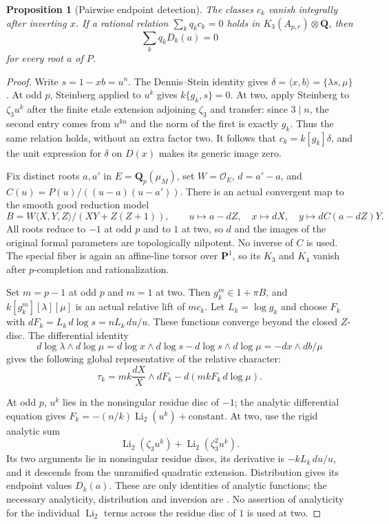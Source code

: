 \documentclass[11pt,a4paper]{article}
\newtheorem{proposition}[theorem]{Proposition}
\theoremstyle{remark}
\begin{document}
\begin{proposition}[Pairwise endpoint detection]
\label{prop:directtcendpoints}
The classes $c_k$ vanish integrally after inverting $x$.
If a rational relation $\sum_k q_kc_k=0$ holds in
$K_3(A_{p,r})\otimes\mathbf Q$, then
\[
       \sum_k q_kD_k(a)=0
\]
for every root $a$ of $P$.
\end{proposition}
\begin{proof}
Write $s=1-xb=u^n$. The Dennis--Stein identity gives
$\delta=\langle x,b\rangle=\{\lambda s,\mu\}$.
At odd $p$, Steinberg applied to $u^k$ gives $k\{g_k,s\}=0$.
At two, apply Steinberg to $\zeta_3u^k$ after the finite etale
extension adjoining $\zeta_3$ and transfer: since $3\mid n$, the
second entry comes from $u^{kn}$ and the norm of the first is exactly
$g_k$. Thus the same relation holds, without an extra factor two.
It follows that $c_k=k[g_k]\delta$, and the unit expression for
$\delta$ on $D(x)$ makes its generic image zero.

Fix distinct roots $a,a'$ in $E=\mathbf Q_p(\mu_M)$, set
$W=\mathcal O_E$, $d=a'-a$, and
$C(u)=P(u)/((u-a)(u-a'))$. There is an actual convergent map to the
smooth good reduction model
\[
 B=W\langle X,Y,Z\rangle/(XY+Z(Z+1)),\qquad
 u\mapsto a-dZ,\quad x\mapsto dX,\quad
 y\mapsto dC(a-dZ)Y.
\]
All roots reduce to $-1$ at odd $p$ and to $1$ at two, so $d$ and
the images of the original formal parameters are topologically
nilpotent. No inverse of $C$ is used. The special fiber is again an
affine-line torsor over $\mathbf P^1$, so its $K_3$ and $K_4$
vanish after $p$-completion and rationalization.

Set $m=p-1$ at odd $p$ and $m=1$ at two. Then $g_k^m\in1+\pi B$,
and $k[g_k^m][\lambda][\mu]$ is an actual relative lift of $mc_k$.
Let $L_k=\log g_k$ and choose $F_k$ with
$dF_k=L_k\,d\log s=nL_k\,du/u$. These functions converge beyond
the closed $Z$-disc. The differential identity
\[
 d\log\lambda\wedge d\log\mu
 =d\log x\wedge d\log s-d\log s\wedge d\log\mu
 =-dx\wedge db/\mu
\]
gives the following global representative of the relative character:
\[
 \tau_k=mk\frac{dX}{X}\wedge dF_k
                         -d(mkF_k\,d\log\mu).
\]

At odd $p$, $u^k$ lies in the nonsingular residue disc of $-1$;
the analytic differential equation gives
$F_k=-(n/k)\operatorname{Li}_2(u^k)+\mathrm{constant}$.
At two, use the rigid analytic sum
\[
 \operatorname{Li}_2(\zeta_3u^k)+
                   \operatorname{Li}_2(\zeta_3^2u^k).
\]
Its two arguments lie in nonsingular residue discs, its derivative is
$-kL_k\,du/u$, and it descends from the unramified quadratic
extension. Distribution gives its endpoint values $D_k(a)$.
These are only identities of analytic functions; the necessary
analyticity, distribution and inversion are
\cite[Theorem~2.7(1), Proposition~4.4, Proposition~2.10]{BesserDeJeuAlgorithm}.
No assertion of analyticity for the individual $\operatorname{Li}_2$
terms across the residue disc of $1$ is used at two.


\end{proof}
\end{document}
